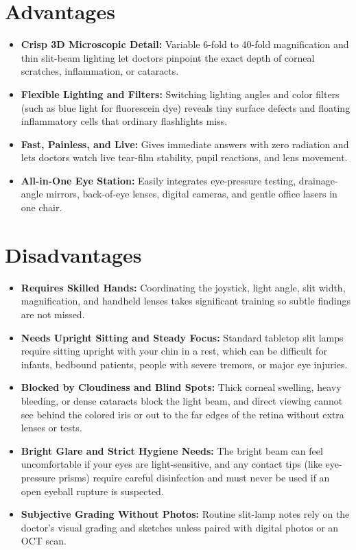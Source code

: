 \section{Advantages}

\begin{itemize}
    \item \textbf{Crisp 3D Microscopic Detail:} Variable 6-fold to 40-fold magnification and thin slit-beam lighting let doctors pinpoint the exact depth of corneal scratches, inflammation, or cataracts.
    \item \textbf{Flexible Lighting and Filters:} Switching lighting angles and color filters (such as blue light for fluorescein dye) reveals tiny surface defects and floating inflammatory cells that ordinary flashlights miss.
    \item \textbf{Fast, Painless, and Live:} Gives immediate answers with zero radiation and lets doctors watch live tear-film stability, pupil reactions, and lens movement.
    \item \textbf{All-in-One Eye Station:} Easily integrates eye-pressure testing, drainage-angle mirrors, back-of-eye lenses, digital cameras, and gentle office lasers in one chair.
\end{itemize}

\section{Disadvantages}

\begin{itemize}
    \item \textbf{Requires Skilled Hands:} Coordinating the joystick, light angle, slit width, magnification, and handheld lenses takes significant training so subtle findings are not missed.
    \item \textbf{Needs Upright Sitting and Steady Focus:} Standard tabletop slit lamps require sitting upright with your chin in a rest, which can be difficult for infants, bedbound patients, people with severe tremors, or major eye injuries.
    \item \textbf{Blocked by Cloudiness and Blind Spots:} Thick corneal swelling, heavy bleeding, or dense cataracts block the light beam, and direct viewing cannot see behind the colored iris or out to the far edges of the retina without extra lenses or tests.
    \item \textbf{Bright Glare and Strict Hygiene Needs:} The bright beam can feel uncomfortable if your eyes are light-sensitive, and any contact tips (like eye-pressure prisms) require careful disinfection and must never be used if an open eyeball rupture is suspected.
    \item \textbf{Subjective Grading Without Photos:} Routine slit-lamp notes rely on the doctor's visual grading and sketches unless paired with digital photos or an OCT scan.
\end{itemize}

